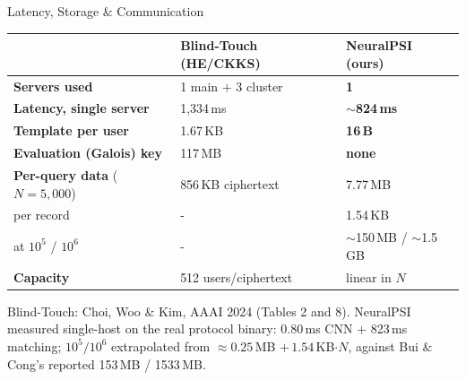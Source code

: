 \documentclass{beamer}
\begin{document}
\begin{frame}{Latency, Storage \& Communication}
  \begin{table}
    \centering
    \scriptsize
    \setlength{\extrarowheight}{1.8pt}
    \begin{tabular}{@{}L{3.9cm}L{3.0cm}L{3.0cm}@{}}
      \toprule
      & \textbf{Blind-Touch (HE/CKKS)} & \textbf{NeuralPSI (ours)} \\
      \midrule
      \textbf{Servers used} & 1 main $+$ 3 cluster & \textbf{1} \\
      \textbf{Latency, single server} & 1{,}334\,ms & \textbf{$\sim$824\,ms} \\
      \midrule
      \textbf{Template per user} & 1.67\,KB & \textbf{16\,B} \\
      \textbf{Evaluation (Galois) key} & 117\,MB & \textbf{none} \\
      \midrule
      \textbf{Per-query data} ($N=5{,}000$) & 856\,KB ciphertext & 7.77\,MB \\
      \quad per record & - & 1.54\,KB \\
      \quad at $10^5$ / $10^6$ & - & $\sim$150\,MB / $\sim$1.5\,GB \\
      \midrule
      \textbf{Capacity} & 512 users/ciphertext & linear in $N$ \\
      \bottomrule
    \end{tabular}
  \end{table}

  \vspace{0.35cm}
  {\scriptsize
  Blind-Touch: Choi, Woo \& Kim, AAAI 2024 (Tables 2 and 8). NeuralPSI measured single-host on the
  real protocol binary: 0.80\,ms CNN $+$ 823\,ms matching; $10^5/10^6$ extrapolated from
  $\approx0.25$\,MB $+\,1.54$\,KB$\cdot N$, against Bui \& Cong's reported 153\,MB / 1533\,MB.}
\end{frame}
\end{document}
